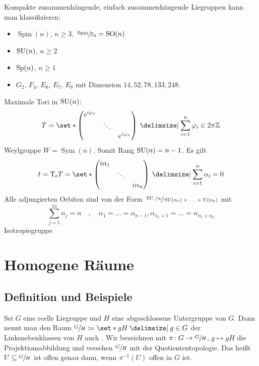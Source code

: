 Kompakte zusammenhängende, einfach zusammenhängende Liegruppen kann man klassifizieren: 
\begin{itemize}
	\item $\operatorname{Spin}(n)$, $n \ge 3$, $\sfrac{\operatorname{Spin}}{\mathbb{Z}_2} = \operatorname{SO}(n)$
	\item $\operatorname{SU}(n)$, $n \ge 2$
	\item $\operatorname{Sp}(n)$, $n \ge 1$
	\item $G_2$, $F_4$, $E_6$, $E_7$, $E_8$ mit Dimension $14,52,78,133,248$.
\end{itemize}
Maximale Tori in $\operatorname{SU}(n)$: 
\[
	T = \set*{\begin{pmatrix}
		e^{i \varphi_1} & & \\
		& \ddots & \\
		& & e^{i \varphi_n}
	\end{pmatrix} \given \sum_{i=1}^{n} \varphi_i \in 2 \pi \mathbb{Z}}
\]
Weylgruppe $W = \operatorname{Sym}(n)$. Somit Rang $\operatorname{SU}(n)=n-1$.
Es gilt 
\[
	t = \Tmap_e T = \set*{ \begin{pmatrix}
		i \alpha_1 & & \\
		& \ddots & \\
		& & i \alpha_n
	\end{pmatrix} \given \sum_{i=1}^{n} \alpha_i = 0}
\]
Alle adjungierten Orbiten sind von der Form $\sfrac{\operatorname{SU}/n}{\operatorname{SU}(n_1) \times \ldots \times \operatorname{U}(n_k)}$ mit
\[
	\sum_{j=1}^{1n} n_j = n \quad , \quad \alpha_1 = \ldots = \alpha_{n-1}, \alpha_{n_1 +1} = \ldots = \alpha_{n_1 +n_2}
\]
Isotropiegruppe

\chapter{Homogene Räume} %
\label{cha:3}

\section{Definition und Beispiele} %
\label{sec:31}

\begin{definition}[{name=[homogener Raum]}]
	Sei $G$ eine reelle Liegruppe und $H$ eine abgeschlossene Untergruppe von $G$.
	Dann nennt man den Raum $\sfrac{G}{H} \coloneqq \set*{g H \given g \in G}$ der Linksnebenklassen von $H$ auch . 
	Wir bezeichnen mit $\pi \colon G \to \sfrac{G}{H}$, $g \mapsto gH$ die Projektionsabbildung und versehen $\sfrac{G}{H}$ mit der Quotiententopologie.
	Das heißt $U \subseteq \sfrac{G}{H}$ ist offen genau dann, wenn $\pi^{-1}(U)$ offen in $G$ ist.
\end{definition}

